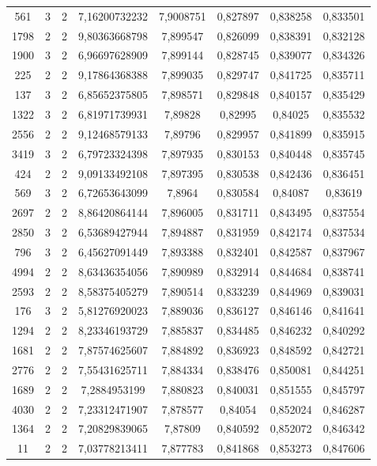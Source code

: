 \begin{longtable}{|c|c|c|c|c|c|c|c|}
561 & 3 & 2 & 7,16200732232 & 7,9008751 & 0,827897 & 0,838258 & 0,833501 \\
1798 & 2 & 2 & 9,80363668798 & 7,899547 & 0,826099 & 0,838391 & 0,832128 \\
1900 & 3 & 2 & 6,96697628909 & 7,899144 & 0,828745 & 0,839077 & 0,834326 \\
225 & 2 & 2 & 9,17864368388 & 7,899035 & 0,829747 & 0,841725 & 0,835711 \\
137 & 3 & 2 & 6,85652375805 & 7,898571 & 0,829848 & 0,840157 & 0,835429 \\
1322 & 3 & 2 & 6,81971739931 & 7,89828 & 0,82995 & 0,84025 & 0,835532 \\
2556 & 2 & 2 & 9,12468579133 & 7,89796 & 0,829957 & 0,841899 & 0,835915 \\
3419 & 3 & 2 & 6,79723324398 & 7,897935 & 0,830153 & 0,840448 & 0,835745 \\
424 & 2 & 2 & 9,09133492108 & 7,897395 & 0,830538 & 0,842436 & 0,836451 \\
569 & 3 & 2 & 6,72653643099 & 7,8964 & 0,830584 & 0,84087 & 0,83619 \\
2697 & 2 & 2 & 8,86420864144 & 7,896005 & 0,831711 & 0,843495 & 0,837554 \\
2850 & 3 & 2 & 6,53689427944 & 7,894887 & 0,831959 & 0,842174 & 0,837534 \\
796 & 3 & 2 & 6,45627091449 & 7,893388 & 0,832401 & 0,842587 & 0,837967 \\
4994 & 2 & 2 & 8,63436354056 & 7,890989 & 0,832914 & 0,844684 & 0,838741 \\
2593 & 2 & 2 & 8,58375405279 & 7,890514 & 0,833239 & 0,844969 & 0,839031 \\
176 & 3 & 2 & 5,81276920023 & 7,889036 & 0,836127 & 0,846146 & 0,841641 \\
1294 & 2 & 2 & 8,23346193729 & 7,885837 & 0,834485 & 0,846232 & 0,840292 \\
1681 & 2 & 2 & 7,87574625607 & 7,884892 & 0,836923 & 0,848592 & 0,842721 \\
2776 & 2 & 2 & 7,55431625711 & 7,884334 & 0,838476 & 0,850081 & 0,844251 \\
1689 & 2 & 2 & 7,2884953199 & 7,880823 & 0,840031 & 0,851555 & 0,845797 \\
4030 & 2 & 2 & 7,23312471907 & 7,878577 & 0,84054 & 0,852024 & 0,846287 \\
1364 & 2 & 2 & 7,20829839065 & 7,87809 & 0,840592 & 0,852072 & 0,846342 \\
11 & 2 & 2 & 7,03778213411 & 7,877783 & 0,841868 & 0,853273 & 0,847606 \\

\end{longtable}
